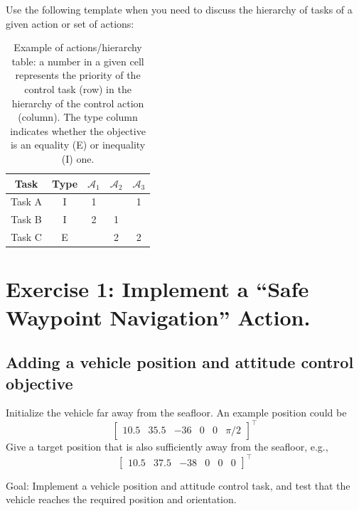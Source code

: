 \documentclass{article}
\begin{document}
Use the following template when you need to discuss the hierarchy of tasks of a given action or set of actions:
\begin{table}[htb]
	\caption{Example of actions/hierarchy table: a number in a given cell represents the priority of the control task (row) in the hierarchy of the control action (column). The type column indicates whether the objective is an equality (E) or inequality (I) one.}
	\label{tbl:actions_table}
	\begin{center}
		\footnotesize
		\begin{tabular}{ccccc}
			\toprule
			Task & Type & $\mathcal{A}_{1}$ & $\mathcal{A}_{2}$ & $\mathcal{A}_{3} $	 \\
			\midrule
			Task A                    & I & 1 &   & 1  \\
			\hdashline
			Task B                & I & 2 & 1 &   \\
			\hdashline
			Task C                       & E &   & 2 & 2   \\

			\bottomrule
		\end{tabular}
	\end{center}
\end{table}%

\clearpage


\section{Exercise 1: Implement a “Safe Waypoint Navigation” Action.}

\subsection{Adding a vehicle position and attitude control objective}
Initialize the vehicle far away from the seafloor. An example position could be
\begin{displaymath}
\begin{bmatrix} 10.5 & 35.5 & -36 & 0 & 0 & \pi/2\end{bmatrix}^\top
\end{displaymath} 
Give a target position that is also sufficiently away from the seafloor, e.g.,
\begin{displaymath}
\begin{bmatrix} 10.5 & 37.5 & -38 & 0 & 0 & 0 \end{bmatrix}^\top
\end{displaymath}

Goal: Implement a vehicle position and attitude control task, and test that the vehicle reaches the required position and orientation.
\end{document}
